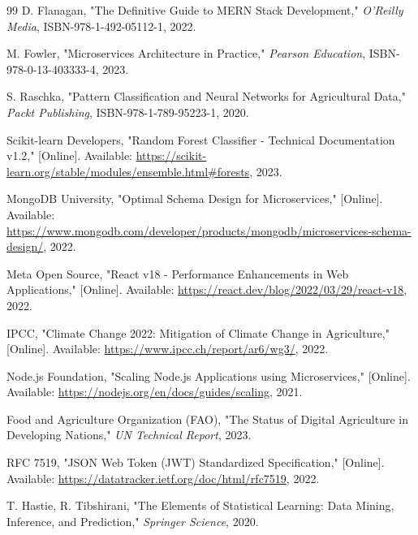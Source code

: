 \documentclass[12pt,a4paper]{report}
\begin{document}
\begin{thebibliography}{99}
     D. Flanagan, "The Definitive Guide to MERN Stack Development," \textit{O'Reilly Media}, ISBN-978-1-492-05112-1, 2022.
    
     M. Fowler, "Microservices Architecture in Practice," \textit{Pearson Education}, ISBN-978-0-13-403333-4, 2023.
    
     S. Raschka, "Pattern Classification and Neural Networks for Agricultural Data," \textit{Packt Publishing}, ISBN-978-1-789-95223-1, 2020.

     Scikit-learn Developers, "Random Forest Classifier - Technical Documentation v1.2," [Online]. Available: \url{https://scikit-learn.org/stable/modules/ensemble.html#forests}, 2023.
    
     MongoDB University, "Optimal Schema Design for Microservices," [Online]. Available: \url{https://www.mongodb.com/developer/products/mongodb/microservices-schema-design/}, 2022.
    
     Meta Open Source, "React v18 - Performance Enhancements in Web Applications," [Online]. Available: \url{https://react.dev/blog/2022/03/29/react-v18}, 2022.
    
     IPCC, "Climate Change 2022: Mitigation of Climate Change in Agriculture," [Online]. Available: \url{https://www.ipcc.ch/report/ar6/wg3/}, 2022.
    
     Node.js Foundation, "Scaling Node.js Applications using Microservices," [Online]. Available: \url{https://nodejs.org/en/docs/guides/scaling}, 2021.

     Food and Agriculture Organization (FAO), "The Status of Digital Agriculture in Developing Nations," \textit{UN Technical Report}, 2023.

     RFC 7519, "JSON Web Token (JWT) Standardized Specification," [Online]. Available: \url{https://datatracker.ietf.org/doc/html/rfc7519}, 2022.

     T. Hastie, R. Tibshirani, "The Elements of Statistical Learning: Data Mining, Inference, and Prediction," \textit{Springer Science}, 2020.

\end{thebibliography}
\end{document}
